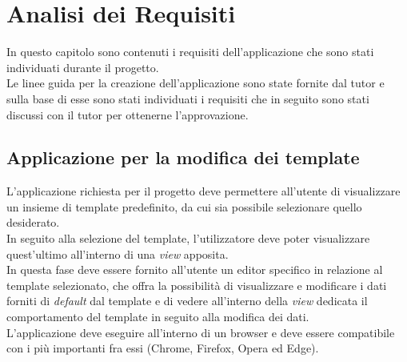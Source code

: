 
\chapter{Analisi dei Requisiti}
\label{cap:analisi-dei-requisiti}
In questo capitolo sono contenuti i requisiti dell'applicazione che sono stati individuati durante il progetto.\\
Le linee guida per la creazione dell'applicazione sono state fornite dal tutor e sulla base di esse sono stati individuati i requisiti che in seguito sono stati discussi con il tutor per ottenerne l'approvazione.

\section{Applicazione per la modifica dei template}
L'applicazione richiesta per il progetto deve permettere all'utente di visualizzare un insieme di template predefinito, da cui sia possibile selezionare quello desiderato.\\
In seguito alla selezione del template, l'utilizzatore deve poter visualizzare quest'ultimo all'interno di una \textit{view} apposita.\\
In questa fase deve essere fornito all'utente un editor specifico in relazione al template selezionato, che offra la possibilità di visualizzare e modificare i dati forniti di \textit{default} dal template e di vedere all'interno della \textit{view} dedicata il comportamento del template in seguito alla modifica dei dati.\\
L'applicazione deve eseguire all'interno di un browser e deve essere compatibile con i più importanti fra essi (Chrome, Firefox, Opera ed Edge).
